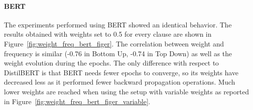 \paragraph{BERT}
The experiments performed using BERT showed an identical behavior. The results obtained with weights set to 0.5 for every clause are shown in Figure~\ref{fig:weight_freq_bert_figer}. The correlation between weight and frequency is similar (-0.76 in Bottom Up, -0.74 in Top Down) as well as the weight evolution during the epochs. The only difference with respect to DistilBERT is that BERT needs fewer epochs to converge, so its weights have decreased less as it performed fewer backward propagation operations. Much lower weights are reached when using the setup with variable weights as reported in Figure~\ref{fig:weight_freq_bert_figer_variable}.


